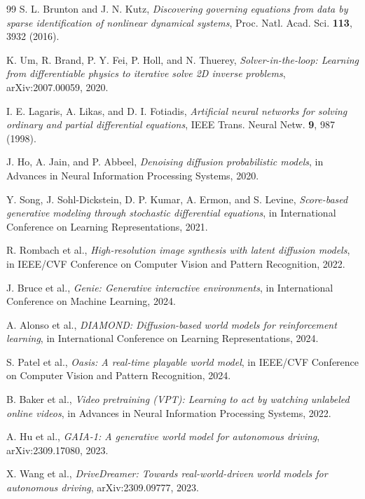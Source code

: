 \documentclass[reprint,aps,pre]{revtex4-2}
\begin{document}
\begin{thebibliography}{99}
S. L. Brunton and J. N. Kutz, \textit{Discovering governing equations from data by sparse identification of nonlinear dynamical systems}, Proc. Natl. Acad. Sci. \textbf{113}, 3932 (2016).

K. Um, R. Brand, P. Y. Fei, P. Holl, and N. Thuerey, \textit{Solver-in-the-loop: Learning from differentiable physics to iterative solve 2D inverse problems}, arXiv:2007.00059, 2020.

I. E. Lagaris, A. Likas, and D. I. Fotiadis, \textit{Artificial neural networks for solving ordinary and partial differential equations}, IEEE Trans. Neural Netw. \textbf{9}, 987 (1998).

J. Ho, A. Jain, and P. Abbeel, \textit{Denoising diffusion probabilistic models}, in Advances in Neural Information Processing Systems, 2020.

Y. Song, J. Sohl-Dickstein, D. P. Kumar, A. Ermon, and S. Levine, \textit{Score-based generative modeling through stochastic differential equations}, in International Conference on Learning Representations, 2021.

R. Rombach et al., \textit{High-resolution image synthesis with latent diffusion models}, in IEEE/CVF Conference on Computer Vision and Pattern Recognition, 2022.

J. Bruce et al., \textit{Genie: Generative interactive environments}, in International Conference on Machine Learning, 2024.

A. Alonso et al., \textit{DIAMOND: Diffusion-based world models for reinforcement learning}, in International Conference on Learning Representations, 2024.

S. Patel et al., \textit{Oasis: A real-time playable world model}, in IEEE/CVF Conference on Computer Vision and Pattern Recognition, 2024.

B. Baker et al., \textit{Video pretraining (VPT): Learning to act by watching unlabeled online videos}, in Advances in Neural Information Processing Systems, 2022.

A. Hu et al., \textit{GAIA-1: A generative world model for autonomous driving}, arXiv:2309.17080, 2023.

X. Wang et al., \textit{DriveDreamer: Towards real-world-driven world models for autonomous driving}, arXiv:2309.09777, 2023.


\end{thebibliography}
\end{document}
